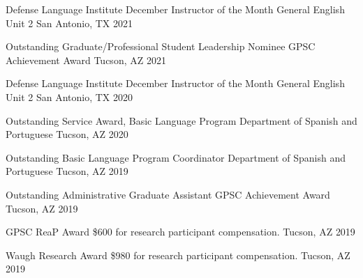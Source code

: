 

\begin{cvhonors}


\cvhonor
{Defense Language Institute December Instructor of the Month} %
{General English Unit 2} %
{San Antonio, TX} %
{2021} %


\cvhonor
{Outstanding Graduate/Professional Student Leadership Nominee} %
{GPSC Achievement Award} %
{Tucson, AZ} %
{2021} %


\cvhonor
{Defense Language Institute December Instructor of the Month} %
{General English Unit 2} %
{San Antonio, TX} %
{2020} %


\cvhonor
{Outstanding Service Award, Basic Language Program} %
{Department of Spanish and Portuguese} %
{Tucson, AZ} %
{2020} %


\cvhonor
{Outstanding Basic Language Program Coordinator} %
{Department of Spanish and Portuguese} %
{Tucson, AZ} %
{2019} %

\cvhonor
{Outstanding Administrative Graduate Assistant} %
{GPSC Achievement Award} %
{Tucson, AZ} %
{2019} %


\cvhonor
{GPSC ReaP Award} %
{\$600 for research participant compensation.} %
{Tucson, AZ} %
{2019} %


\cvhonor
{Waugh Research Award} %
{\$980 for research participant compensation.} %
{Tucson, AZ} %
{2019} %


\end{cvhonors}
